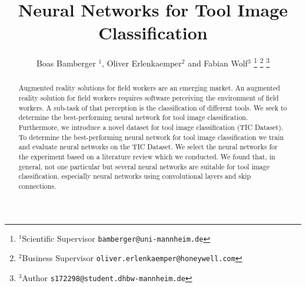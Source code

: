 \documentclass[a4paper, 10pt, journal]{wissarbIEEE}
\title{\LARGE \bf Neural Networks for Tool Image Classification}
\author{Boas Bamberger $^{1}$, Oliver Erlenkaemper$^{2}$ and Fabian Wolf$^{3}$ 
\thanks{$^{1}$Scientific Supervisor {\tt\small bamberger@uni-mannheim.de}} \thanks{$^{2}$Business Supervisor {\tt\small oliver.erlenkaemper@honeywell.com}} \thanks{$^{3}$Author {\tt\small s172298@student.dhbw-mannheim.de}}
}
\begin{document}
\maketitle
\begin{abstract}
Augmented reality solutions for field workers are an emerging market.\cite{EY.2019a, EY.2019b, Detzel.2018, Shook.2019, Guy.2019} An augmented reality solution for field workers requires software perceiving the environment of field workers. A sub-task of that perception is the classification of different tools.
We seek to determine the best-performing neural network for tool image classification.
Furthermore, we introduce a novel dataset for tool image classification (TIC Dataset). To determine the best-performing neural network for tool image classification we train and evaluate neural networks on the TIC Dataset. We select the neural networks for the experiment based on a literature review which we conducted.
We found that, in general, not one particular but several neural networks are suitable for tool image classification, especially neural networks using convolutional layers and skip connections.
\end{abstract}
\end{document}
